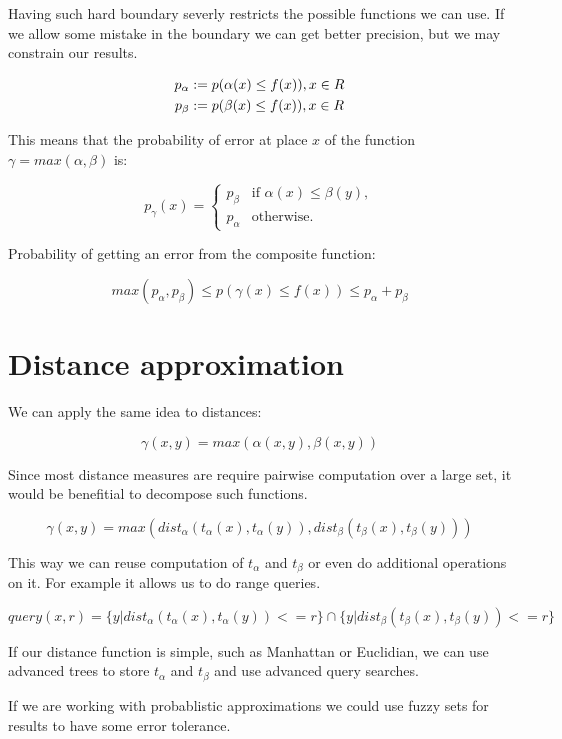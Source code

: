 \documentclass [12pt, a4]{article} %
\begin{document}
Having such hard boundary severly restricts the possible functions we can
use. If we allow some mistake in the boundary we can get better precision,
but we may constrain our results.

\begin{align*}
    p_\alpha &:= p(\alpha(x) \leq f(x)), x \in R \\
    p_\beta &:= p(\beta(x)  \leq f(x)), x \in R 
\end{align*}

This means that the probability of error at place $x$ of the 
function $\gamma = max(\alpha, \beta)$ is:

$$ p_\gamma(x) = \begin{cases}
    p_\beta & \text{if $\alpha(x) \leq \beta(y)$}, \\
    p_\alpha & \text{otherwise}.
\end{cases}
$$

Probability of getting an error from the composite function:

$$
    max(p_\alpha, p_\beta) \leq p(\gamma(x) \leq f(x)) \leq p_\alpha + p_\beta
$$

\section{Distance approximation}

We can apply the same idea to distances:

$$
  \gamma(x,y) = max(\alpha(x,y), \beta(x,y))
$$

Since most distance measures are require pairwise computation over
a large set, it would be benefitial to decompose such functions.

$$
  \gamma(x,y) = max( dist_\alpha(t_\alpha(x), t_\alpha(y)), dist_\beta(t_\beta(x), t_\beta(y)) )
$$

This way we can reuse computation of $t_\alpha$ and $t_\beta$ or even do additional operations on it. For example it allows us to do range queries.

$$
  query(x,r) = \{ y | dist_\alpha(t_\alpha(x), t_\alpha(y)) <= r \} \cap \{ y | dist_\beta(t_\beta(x), t_\beta(y)) <= r \}
$$

If our distance function is simple, such as Manhattan or Euclidian, we can 
use advanced trees to store $t_\alpha$ and $t_\beta$ and use advanced query searches.

If we are working with probablistic approximations we could use fuzzy sets for 
results to have some error tolerance.
\end{document}
